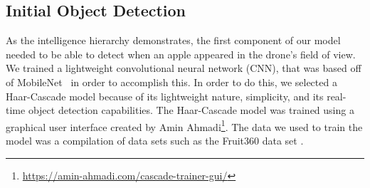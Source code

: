 \subsection{Initial Object Detection}
As the intelligence hierarchy demonstrates, the first component of our model needed to be able to detect when an apple appeared in the drone's field of view. 
We trained a lightweight convolutional neural network (CNN), that was based off of MobileNet~\cite{Sandler2018,PyTorchMobileNet} in order to accomplish this. 
In order to do this, we selected a Haar-Cascade model because of its lightweight nature, simplicity, and its real-time object detection capabilities. The Haar-Cascade model was trained using a graphical user interface created by Amin Ahmadi\footnote{\url{https://amin-ahmadi.com/cascade-trainer-gui/}}. The data we used to train the model was a compilation of data sets such as the Fruit360 data set \cite{Fruit360}.  